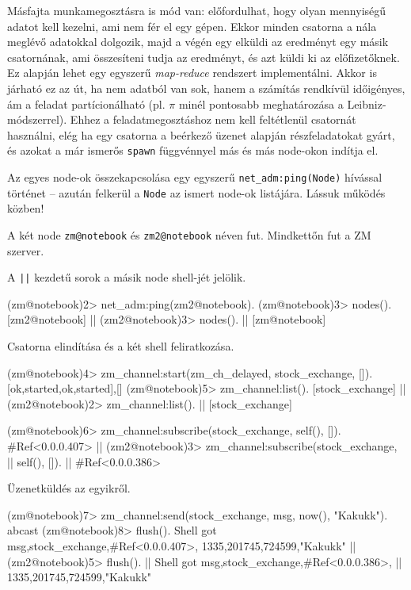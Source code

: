 \documentclass[12pt, a4paper, oneside]{book}
\begin{document}
Másfajta munkamegosztásra is mód van: előfordulhat, hogy olyan mennyiségű
adatot kell kezelni, ami nem fér el egy gépen. Ekkor minden csatorna a nála
meglévő adatokkal dolgozik, majd a végén egy elküldi az eredményt egy másik
csatornának, ami összesíteni tudja az eredményt, és azt küldi ki az
előfizetőknek. Ez alapján lehet egy egyszerű \emph{map-reduce} rendszert
implementálni. Akkor is járható ez az út, ha nem adatból van sok, hanem a
számítás rendkívül időigényes, ám a feladat partícionálható (pl. $\pi$ minél
pontosabb meghatározása a Leibniz-módszerrel). Ehhez a feladatmegosztáshoz nem
kell feltétlenül csatornát használni, elég ha egy csatorna a beérkező üzenet
alapján részfeladatokat gyárt, és azokat a már ismerős \texttt{spawn}
függvénnyel más és más node-okon indítja el.

Az egyes node-ok összekapcsolása egy egyszerű \texttt{net\_adm:ping(Node)}
hívással történet -- azután felkerül a \texttt{Node} az ismert node-ok
listájára. Lássuk működés közben! 

A két node \texttt{zm@notebook} és \texttt{zm2@notebook} néven fut. Mindkettőn
fut a ZM szerver.

A \texttt{||} kezdetű sorok a másik node shell-jét jelölik.

\begin{code}{}{}
(zm@notebook)2> net_adm:ping(zm2@notebook).
(zm@notebook)3> nodes().
[zm2@notebook]
  || (zm2@notebook)3> nodes().
  || [zm@notebook]
\end{code}

Csatorna elindítása és a két shell feliratkozása.

\begin{code}{}{}
(zm@notebook)4> zm_channel:start(zm_ch_delayed, 
                                 stock_exchange, []).
{[{ok,started},{ok,started}],[]}
(zm@notebook)5> zm_channel:list().
[stock_exchange]
  || (zm2@notebook)2> zm_channel:list().
  || [stock_exchange]

(zm@notebook)6> zm_channel:subscribe(stock_exchange, self(), []).   
#Ref<0.0.0.407>
  || (zm2@notebook)3> zm_channel:subscribe(stock_exchange, 
  ||                                       self(), []).
  || #Ref<0.0.0.386>
\end{code}

Üzenetküldés az egyikről.

\begin{code}{}{}
(zm@notebook)7> zm_channel:send(stock_exchange, 
                                {msg, {now(), "Kakukk"}}).
abcast
(zm@notebook)8> flush().
Shell got {msg,{stock_exchange,#Ref<0.0.0.407>},
               {{1335,201745,724599},"Kakukk"}}
  || (zm2@notebook)5> flush().
  || Shell got {msg,{stock_exchange,#Ref<0.0.0.386>},
  ||                {{1335,201745,724599},"Kakukk"}}
\end{code}
\end{document}
